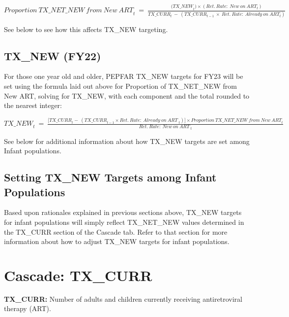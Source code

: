 \documentclass[
  openany]{book}
\begin{document}
\begin{center} ${Proportion\ TX\_ NET\_ NEW\ from\ New\ ART}_{t}\  = \ \frac{{(TX\_ NEW}_{t}) \times ({Ret.\ Rate:\ New\ on\ ART}_{t})}{{TX\_ CURR}_{t}\  - \ ({TX\_ CURR}_{t - 1}\  \times \ {Ret.\ Rate:\ Already\ on\ ART}_{t})}$ \end{center}

See below to see how this affects TX\_NEW targeting.

\hypertarget{tx_new-fy22}{%
\subsection{TX\_NEW (FY22)}\label{tx_new-fy22}}

For those one year old and older, PEPFAR TX\_NEW targets for FY23 will be
set using the formula laid out above for Proportion of TX\_NET\_NEW from
New ART, solving for TX\_NEW, with each component and the total rounded
to the nearest integer:

\begin{center} ${TX\_NEW}_{t}\  = \ \frac{\lbrack{TX\_ CURR}_{t} - \ ({TX\_ CURR}_{t - 1} \times {Ret.\ Rate:\ Already\ on\ ART\ }_{t})\rbrack \times {Proportion\ TX\_ NET\_ NEW\ from\ New\ ART}_{t}}{{Ret.\ Rate:\ New\ on\ ART\ }_{t}}$ \end{center}

See below for additional information about how TX\_NEW targets are set
among Infant populations.

\hypertarget{setting-tx_new-targets-among-infant-populations}{%
\subsection{Setting TX\_NEW Targets among Infant Populations}\label{setting-tx_new-targets-among-infant-populations}}

Based upon rationales explained in previous sections above, TX\_NEW
targets for infant populations will simply reflect TX\_NET\_NEW values
determined in the TX\_CURR section of the Cascade tab. Refer to that
section for more information about how to adjust TX\_NEW targets for
infant populations.

\hypertarget{cascade-tx_curr}{%
\section{Cascade: TX\_CURR}\label{cascade-tx_curr}}

\textbf{TX\_CURR:} Number of adults and children currently receiving
antiretroviral therapy (ART).
\end{document}
